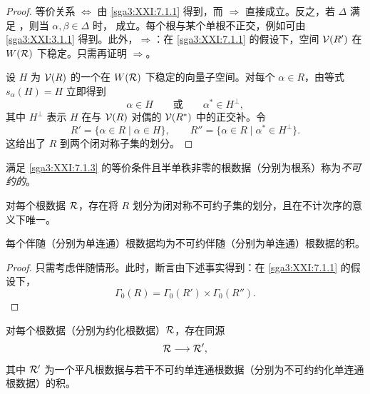 \begin{proof}
等价关系 \(\Leftrightarrow\) 由 \ref{sga3:XXI:7.1.1} 得到，而 \(\Rightarrow\) 直接成立。反之，若 \(\Delta\) 满足 ，则当 \(\alpha,\beta\in\Delta\) 时， 成立。每个根与某个单根不正交，例如可由 \ref{sga3:XXI:3.1.1} 得到。此外，\(\Rightarrow\)：在 \ref{sga3:XXI:7.1.1} 的假设下，空间 \(\mathcal{V}(R')\) 在 \(W(\mathcal{R})\) 下稳定。只需再证明 \(\Rightarrow\)。

设 \(H\) 为 \(\mathcal{V}(R)\) 的一个在 \(W(\mathcal{R})\) 下稳定的向量子空间。对每个 \(\alpha\in R\)，由等式 \(s_\alpha(H)=H\) 立即得到
\[
 \alpha\in H
 \qquad\text{或}\qquad
 \alpha^\ast\in H^\perp,
\]
其中 \(H^\perp\) 表示 \(H\) 在与 \(\mathcal{V}(R)\) 对偶的 \(\mathcal{V}(R^\ast)\) 中的正交补。令
\[
 R'=\{\alpha\in R\mid\alpha\in H\},
 \qquad
 R''=\{\alpha\in R\mid\alpha^\ast\in H^\perp\}.
\]
这给出了 \(R\) 到两个闭对称子集的划分。
\end{proof}

\begin{definition}\label{sga3:XXI:7.1.4}
满足 \ref{sga3:XXI:7.1.3} 的等价条件且半单秩非零的根数据（分别为根系）称为\emph{不可约的}。
\end{definition}

\begin{corollary}\label{sga3:XXI:7.1.5}
对每个根数据 \(\mathcal{R}\)，存在将 \(R\) 划分为闭对称不可约子集的划分，且在不计次序的意义下唯一。
\end{corollary}

\begin{corollary}\label{sga3:XXI:7.1.6}
每个伴随（分别为单连通）根数据均为不可约伴随（分别为单连通）根数据的积。
\end{corollary}

\begin{proof}
只需考虑伴随情形。此时，断言由下述事实得到：在 \ref{sga3:XXI:7.1.1} 的假设下，
\[
 \Gamma_0(R)=\Gamma_0(R')\times\Gamma_0(R'').
\]
\end{proof}

\begin{corollary}\label{sga3:XXI:7.1.7}
对每个根数据（分别为约化根数据）\(\mathcal{R}\)，存在同源
\[
 \mathcal{R}\longrightarrow\mathcal{R}',
\]
其中 \(\mathcal{R}'\) 为一个平凡根数据与若干不可约单连通根数据（分别为不可约约化单连通根数据）的积。
\end{corollary}

